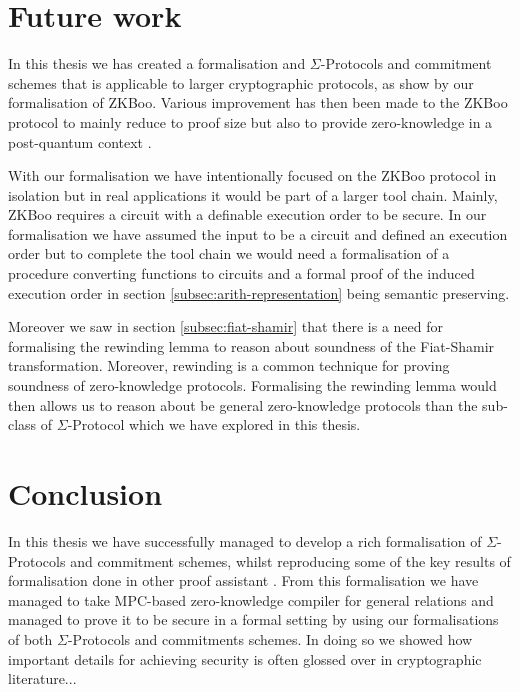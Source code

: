 
\section{Future work}
\label{sec:future_work}
In this thesis we has created a formalisation and $\Sigma$-Protocols and
commitment schemes that is applicable to larger cryptographic protocols, as show
by our formalisation of ZKBoo. Various improvement has then been made to the
ZKBoo protocol to mainly reduce to proof size but also to provide zero-knowledge
in a post-quantum context \cite{zkb++}.

With our formalisation we have intentionally focused on the ZKBoo protocol in
isolation but in real applications it would be part of a larger tool chain.
Mainly, ZKBoo requires a circuit with a definable execution order to be secure.
In our formalisation we have assumed the input to be a circuit and defined an
execution order but to complete the tool chain we would need a formalisation of
a procedure converting functions to circuits and a formal proof of the induced
execution order in section \ref{subsec:arith-representation} being semantic preserving.

Moreover we saw in section \ref{subsec:fiat-shamir} that there is a need for
formalising the rewinding lemma to reason about soundness of the Fiat-Shamir
transformation. Moreover, rewinding is a common technique for proving soundness
of zero-knowledge protocols. Formalising the rewinding lemma would then allows
us to reason about be general zero-knowledge protocols than the sub-class of
$\Sigma$-Protocol which we have explored in this thesis.


\section{Conclusion}
\label{sec:conclusion}

In this thesis we have successfully managed to develop a rich formalisation of
$\Sigma$-Protocols and commitment schemes, whilst reproducing some of the key results of
formalisation done in other proof assistant \cite{cryptoeprint:2019:1185,certicrypt_sigma}.
From this formalisation we have managed to take MPC-based zero-knowledge
compiler for general relations and managed to prove it to be secure in a formal
setting by using our formalisations of both $\Sigma$-Protocols and commitments
schemes. In doing so we showed how important details for achieving security is
often glossed over in cryptographic literature...

